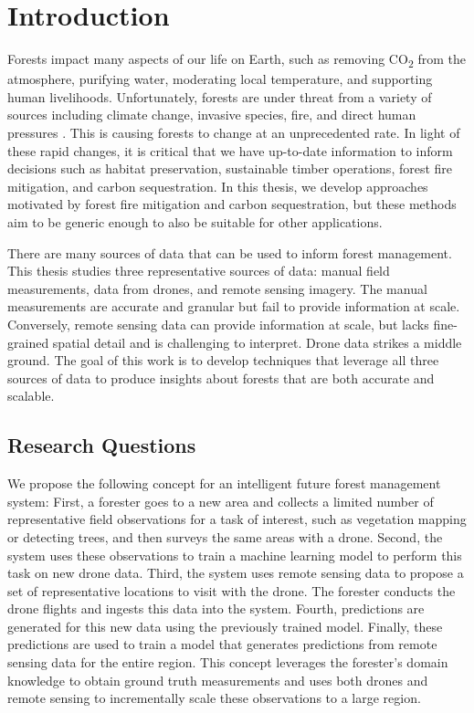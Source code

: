 
\chapter{Introduction} \label{chapIntroduction}
Forests impact many aspects of our life on Earth, such as removing CO\textsubscript{2} from the atmosphere, purifying water, moderating local temperature, and supporting human livelihoods. Unfortunately, forests are under threat from a variety of sources including climate change, invasive species, fire, and direct human pressures \cite{IPCC2019ClimateReport}. This is causing forests to change at an unprecedented rate. In light of these rapid changes, it is critical that we have up-to-date information to inform decisions such as habitat preservation, sustainable timber operations, forest fire mitigation, and carbon sequestration. In this thesis, we develop approaches motivated by forest fire mitigation and carbon sequestration, but these methods aim to be generic enough to also be suitable for other applications. 

There are many sources of data that can be used to inform forest management. This thesis studies three representative sources of data: manual field measurements, data from drones, and remote sensing imagery. The manual measurements are accurate and granular but fail to provide information at scale. Conversely, remote sensing data can provide information at scale, but lacks fine-grained spatial detail and is challenging to interpret. Drone data strikes a middle ground. The goal of this work is to develop techniques that leverage all three sources of data to produce insights about forests that are both accurate and scalable. 


\section{Research Questions}
We propose the following concept for an intelligent future forest management system: First, a forester goes to a new area and collects a limited number of representative field observations for a task of interest, such as vegetation mapping or detecting trees, and then surveys the same areas with a drone. Second, the system uses these observations to train a machine learning model to perform this task on new drone data. Third, the system uses remote sensing data to propose a set of representative locations to visit with the drone. The forester conducts the drone flights and ingests this data into the system. Fourth, predictions are generated for this new data using the previously trained model. Finally, these predictions are used to train a model that generates predictions from remote sensing data for the entire region. This concept leverages the forester's domain knowledge to obtain ground truth measurements and uses both drones and remote sensing to incrementally scale these observations to a large region.

